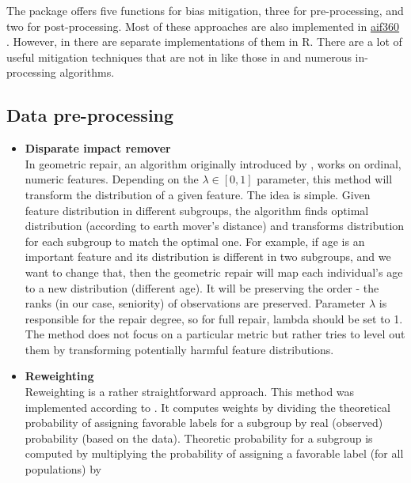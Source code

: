 The  package offers five functions for bias mitigation,
three for pre-processing, and two for post-processing. Most of these
approaches are also implemented in
\href{https://aif360.mybluemix.net/}{aif360} \citep{aif360-oct-2018}.
However, in  there are separate implementations of them
in R. There are a lot of useful mitigation techniques that are not in
 like those in \citet{NIPS20166374} and numerous
in-processing algorithms.

\hypertarget{data-pre-processing}{%
\subsection{Data pre-processing}\label{data-pre-processing}}

\begin{itemize}
\tightlist
\item
  \textbf{Disparate impact remover}\\
  In  geometric repair, an algorithm originally
  introduced by \citet{disparateImpact}, works on ordinal, numeric
  features. Depending on the \(\lambda \in [0,1]\) parameter, this
  method will transform the distribution of a given feature. The idea is
  simple. Given feature distribution in different subgroups, the
  algorithm finds optimal distribution (according to earth mover's
  distance) and transforms distribution for each subgroup to match the
  optimal one. For example, if age is an important feature and its
  distribution is different in two subgroups, and we want to change
  that, then the geometric repair will map each individual's age to a
  new distribution (different age). It will be preserving the order -
  the ranks (in our case, seniority) of observations are preserved.
  Parameter \(\lambda\) is responsible for the repair degree, so for
  full repair, lambda should be set to 1. The method does not focus on a
  particular metric but rather tries to level out them by transforming
  potentially harmful feature distributions.
\item
  \textbf{Reweighting}\\
  Reweighting is a rather straightforward approach. This method was
  implemented according to \citet{kamiran}. It computes weights by
  dividing the theoretical probability of assigning favorable labels for
  a subgroup by real (observed) probability (based on the data).
  Theoretic probability for a subgroup is computed by multiplying the
  probability of assigning a favorable label (for all populations) by

\end{itemize}
